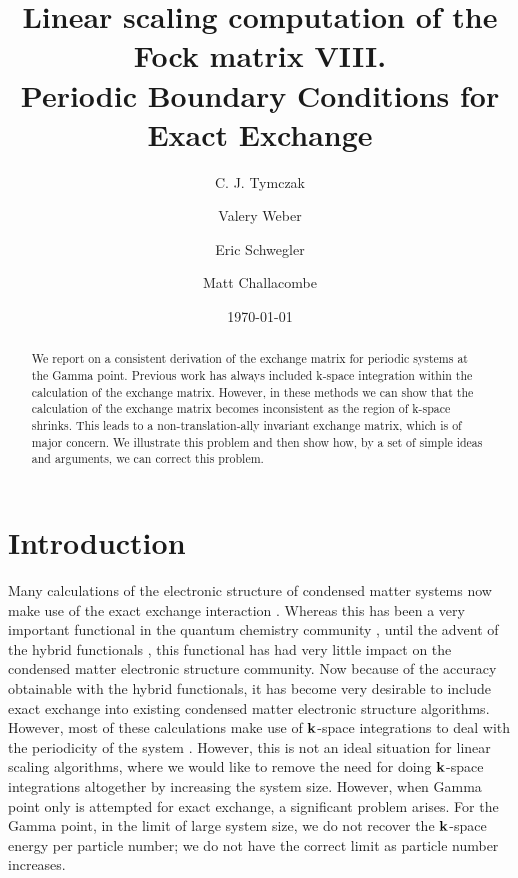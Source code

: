 \documentclass[prb,aps,nobibnotes,twocolumn,doublespace,twocolumngrid,superbib]{revtex4}
\begin{document}
\title{Linear scaling computation of the Fock matrix VIII. \\
       Periodic Boundary Conditions for Exact Exchange}

\author{C. J. Tymczak}
\author{Valery Weber}
\author{Eric Schwegler}
\author{Matt Challacombe}


\date{\today}

\begin{abstract}
We report on a consistent derivation of the exchange matrix for periodic
systems at the Gamma point. Previous work has always included k-space integration 
within the calculation of the exchange matrix. However, in  these methods
we can show that the calculation of the exchange matrix becomes inconsistent as the
region of k-space shrinks. This leads to a non-translation-ally invariant exchange matrix,
which is of major concern. We illustrate this problem and then show how, by a set of
simple ideas and arguments, we can correct this problem.
\end{abstract}

\maketitle

\section{Introduction}
Many calculations of the electronic structure of condensed matter systems now make use
of the exact exchange interaction 
\cite{Pisani80,REvarestov83,MCausa88,JAlmlof94,RDovesi00}. 
Whereas this has been a very
important functional in the quantum chemistry community 
\cite{PLowdin55,py,ASzabo89}, 
until the advent of the hybrid functionals 
\cite{Gill92,Becke93,ABecke96,Adamo99}, 
this functional has had very little impact on the
condensed matter electronic structure community. Now because of the accuracy obtainable with
the hybrid functionals, it has become very desirable to include exact exchange into
existing condensed matter electronic structure algorithms. 
However, most of these calculations make use of ${\bf k}$-space integrations to 
deal with the periodicity of the system \cite{RDovesi00}. However, this is not an ideal situation 
for linear scaling algorithms, where we would like to remove the need for doing
${\bf k}$-space integrations altogether by increasing the system size. 
However, when Gamma point only is attempted for exact exchange, a 
significant problem arises. For the Gamma point, in the limit of large system size,
we do not recover the ${\bf k}$-space energy per particle number; we do not have the correct
limit as particle number increases.  
%
\end{document}
